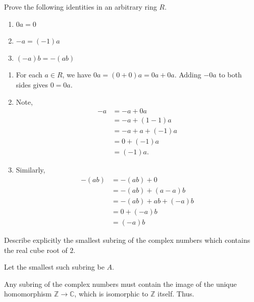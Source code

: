 \documentclass[12 pt, letterpaper]{hmcpset}
\begin{document}
\begin{problem}[1.]
	Prove the following identities in an arbitrary ring $R$.
	\begin{enumerate}
		\item $0 a = 0$ 
		\item $-a = (-1) a$ 
		\item $(-a) b = - (ab)$
	\end{enumerate}
\end{problem}

\begin{solution}
	\begin{enumerate}
		\item For each $a \in R$, we have $0 a = (0 + 0) a = 0 a + 0 a$. Adding $-0 a$ to both sides gives $0 = 0 a$.

		\item Note,
			\begin{align*}
				-a & = -a + 0a \\
				   & = -a + (1 - 1)a \\
				   & = -a + a + (-1)a \\
				   & = 0 + (-1)a \\
				   & = (-1) a.
			\end{align*}

		\item Similarly,
			\begin{align*}
				-(ab) & = -(ab) + 0 \\
				      & = -(ab) + (a - a) b \\
				      & = -(ab) + ab + (-a)b \\
				      & = 0 + (-a)b \\
				      & = (-a) b
			\end{align*}
	\end{enumerate}
\end{solution}

\pagebreak

\begin{problem}[2.]
	Describe explicitly the smallest subring of the complex numbers which contains the real cube root of $2$.
\end{problem}

\begin{solution}
	Let the smallest such subring be $A$.

	Any subring of the complex numbers must contain the image of the unique homomorphism $\mathbb{Z} \to \mathbb{C}$, which is isomorphic to $\mathbb{Z}$ itself. Thus.
\end{solution}
\end{document}
